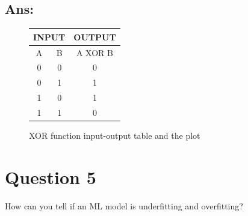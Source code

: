 \documentclass{kthreport}
\begin{document}
\subsection*{Ans:}
\begin{figure}[!ht]
    \centering
    \begin{minipage}{.4\linewidth}
        \centering
        \begin{tabular}{|c|c|c|}
            \hline
            \multicolumn{2}{|c|}{INPUT} & OUTPUT  \\ \hline
            A            & B            & A XOR B \\ \hline
            0            & 0            & 0       \\ \hline
            0            & 1            & 1       \\ \hline
            1            & 0            & 1       \\ \hline
            1            & 1            & 0       \\ \hline
        \end{tabular}
    \end{minipage}
    \begin{minipage}{.4\linewidth}
        \centering
    \end{minipage}
    \caption{XOR function input-output table and the plot}
\end{figure}

\section{Question 5}
How can you tell if an ML model is underfitting and overfitting?
\end{document}
